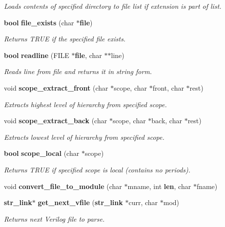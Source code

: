 \begin{CompactItemize}
\begin{CompactList}\small\item\em Loads contents of specified directory to file list if extension is part of list.\item\end{CompactList}\item 
{\bf bool} {\bf file\_\-exists} (char $\ast${\bf file})
\begin{CompactList}\small\item\em Returns TRUE if the specified file exists.\item\end{CompactList}\item 
{\bf bool} {\bf readline} (FILE $\ast${\bf file}, char $\ast$$\ast$line)
\begin{CompactList}\small\item\em Reads line from file and returns it in string form.\item\end{CompactList}\item 
void {\bf scope\_\-extract\_\-front} (char $\ast$scope, char $\ast$front, char $\ast$rest)
\begin{CompactList}\small\item\em Extracts highest level of hierarchy from specified scope.\item\end{CompactList}\item 
void {\bf scope\_\-extract\_\-back} (char $\ast$scope, char $\ast$back, char $\ast$rest)
\begin{CompactList}\small\item\em Extracts lowest level of hierarchy from specified scope.\item\end{CompactList}\item 
{\bf bool} {\bf scope\_\-local} (char $\ast$scope)
\begin{CompactList}\small\item\em Returns TRUE if specified scope is local (contains no periods).\item\end{CompactList}\item 
void {\bf convert\_\-file\_\-to\_\-module} (char $\ast$mname, int {\bf len}, char $\ast$fname)
\item 
{\bf str\_\-link}$\ast$ {\bf get\_\-next\_\-vfile} ({\bf str\_\-link} $\ast$curr, char $\ast$mod)
\begin{CompactList}\small\item\em Returns next Verilog file to parse.\item\end{CompactList}\item 
$$
\end{CompactItemize}

